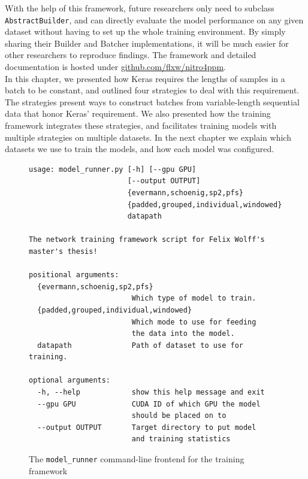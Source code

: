 With the help of this framework, future researchers only need to subclass \verb=AbstractBuilder=, and can directly evaluate the model performance on any given dataset without having to set up the whole training environment. By simply sharing their Builder and Batcher implementations, it will be much easier for other researchers to reproduce findings. The framework and detailed documentation is hosted under \href{https://github.com/flxw/nitro4ppm}{github.com/flxw/nitro4ppm}.\\

In this chapter, we presented how Keras requires the lengths of samples in a batch to be constant,
and outlined four strategies to deal with this requirement.
The strategies present ways to construct batches from variable-length sequential data that honor Keras' requirement.
We also presented how the training framework integrates these strategies, and
facilitates training models with multiple strategies on multiple datasets.
In the next chapter we explain which datasets we use to train the models,
and how each model was configured.

\begin{figure}[!htb]
\centering
\begin{verbatim}
usage: model_runner.py [-h] [--gpu GPU]
                       [--output OUTPUT]
                       {evermann,schoenig,sp2,pfs}
                       {padded,grouped,individual,windowed}
                       datapath

The network training framework script for Felix Wolff's master's thesis!

positional arguments:
  {evermann,schoenig,sp2,pfs}
                        Which type of model to train.
  {padded,grouped,individual,windowed}
                        Which mode to use for feeding
                        the data into the model.
  datapath              Path of dataset to use for training.

optional arguments:
  -h, --help            show this help message and exit
  --gpu GPU             CUDA ID of which GPU the model
                        should be placed on to
  --output OUTPUT       Target directory to put model
                        and training statistics
\end{verbatim}
\caption[CLI frontend for the framework]{The \texttt{model\_runner} command-line frontend for the training framework}
\label{fig:framework-frontend}
\end{figure}

